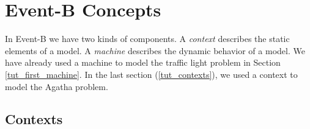 \section{Event-B Concepts}
\label{tut_eventb_concepts}


In Event-B we have two kinds of components.
A \emph{context} describes the static elements of a model. A \emph{machine} describes the dynamic behavior of a model. We have already used a machine to model the traffic light problem in Section \ref{tut_first_machine}. In the last section (\ref{tut_contexts}), we used a context to model the Agatha problem.

\subsection{Contexts}
\label{tut_concepts_contexts}

